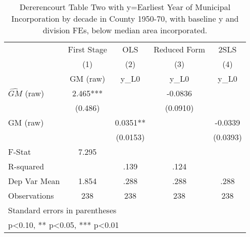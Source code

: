 \begin{table}[htbp]\centering
\def\sym#1{\ifmmode^{#1}\else\(^{#1}\)\fi}
\caption{Dererencourt Table Two with y=Earliest Year of Municipal Incorporation by decade in County 1950-70, with baseline y and division FEs, below median area incorporated.}
\begin{tabular}{l*{4}{c}}
\toprule
                    & First Stage   &         OLS   &Reduced Form   &        2SLS   \\
                    &\multicolumn{1}{c}{(1)}&\multicolumn{1}{c}{(2)}&\multicolumn{1}{c}{(3)}&\multicolumn{1}{c}{(4)}\\
                    &\multicolumn{1}{c}{GM  (raw)}&\multicolumn{1}{c}{y\_L0}&\multicolumn{1}{c}{y\_L0}&\multicolumn{1}{c}{y\_L0}\\
\midrule
$\hat{GM}$ (raw)    &       2.465***&               &     -0.0836   &               \\
                    &     (0.486)   &               &    (0.0910)   &               \\
\addlinespace
GM  (raw)           &               &      0.0351** &               &     -0.0339   \\
                    &               &    (0.0153)   &               &    (0.0393)   \\
\midrule
F-Stat              &       7.295   &               &               &               \\
R-squared           &               &        .139   &        .124   &               \\
Dep Var Mean        &       1.854   &        .288   &        .288   &        .288   \\
Observations        &         238   &         238   &         238   &         238   \\
\bottomrule
\multicolumn{5}{l}{\footnotesize Standard errors in parentheses}\\
\multicolumn{5}{l}{\footnotesize * p<0.10, ** p<0.05, *** p<0.01}\\
\end{tabular}
\end{table}
